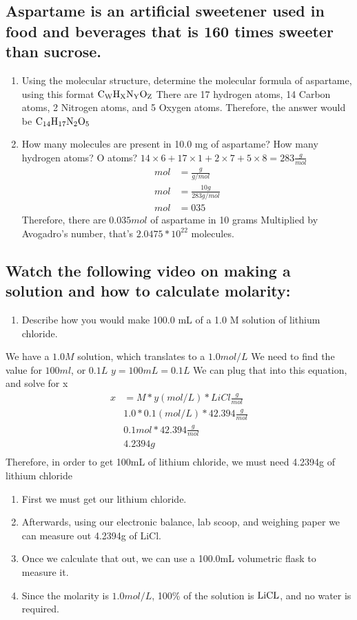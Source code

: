 \documentclass[11pt]{article}
\begin{document}
\subsection{Aspartame is an artificial sweetener used in food and beverages that is 160 times sweeter than sucrose.}
\label{sec:orgd4855a1}
\begin{enumerate}
\item Using the molecular structure, determine the molecular formula of aspartame, using this format \(\ce{C_{W}H_{X}N_{Y}O_{Z}}\)
There are 17 hydrogen atoms, 14 Carbon atoms, 2 Nitrogen atoms, and 5 Oxygen atoms. Therefore, the answer would be \(\ce{C14H17N2O5}\)
\item How many molecules are present in 10.0 mg of aspartame? How many hydrogen atoms? O atoms?
\(14\times6+17\times1+2\times7+5\times8=283\frac{g}{mol}\)
\begin{align*}
mol&=\frac{g}{g/mol}\\
mol&=\frac{10g}{283g/mol}\\
mol&=035
\end{align*}
Therefore, there are \(0.035mol\) of aspartame in 10 grams
Multiplied by Avogadro's number, that's \(2.0475*10^{22}\) molecules.
\end{enumerate}

\subsection{Watch the following video on making a solution and how to calculate molarity:}
\label{sec:orgaf71f2f}
\begin{enumerate}
\item Describe how you would make 100.0 mL of a 1.0 M solution of lithium chloride.
\end{enumerate}
We have a \(1.0M\) solution, which translates to  a \(1.0mol/L\)
We need to find the value for \(100ml\), or \(0.1L\)
\(y = 100mL = 0.1L\)
We can plug that into this equation, and solve for x
\begin{align*}
x&= M * y(mol/L) * LiCl\frac{g}{mol}\\
&1.0 * 0.1(mol/L) * 42.394\frac{g}{mol}\\
&0.1mol * 42.394\frac{g}{mol}\\
&4.2394g\\
\end{align*}
Therefore, in order to get 100mL of lithium chloride, we must need 4.2394g of lithium chloride
\begin{enumerate}
\item First we must get our lithium chloride.
\item Afterwards, using our electronic balance, lab scoop, and weighing paper we can measure out 4.2394g of LiCl.
\item Once we calculate that out, we can use a 100.0mL volumetric flask to measure it.
\item Since the molarity is \(1.0mol/L\), 100\% of the solution is \(\ce{LiCL}\), and no water is required.
\end{enumerate}
\end{document}
